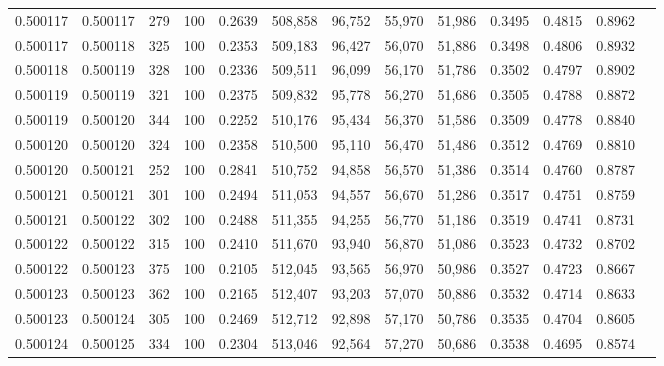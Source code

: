 \begin{tabular}{rrrrrrrrrrrrr}
0.500117 & 0.500117 &   279 & 100 &                                     0.2639 & 508,858 &  96,752 &  55,970 &  51,986 & 0.3495 & 0.4815 & 0.8962 \\
0.500117 & 0.500118 &   325 & 100 &                                     0.2353 & 509,183 &  96,427 &  56,070 &  51,886 & 0.3498 & 0.4806 & 0.8932 \\
0.500118 & 0.500119 &   328 & 100 &                                     0.2336 & 509,511 &  96,099 &  56,170 &  51,786 & 0.3502 & 0.4797 & 0.8902 \\
0.500119 & 0.500119 &   321 & 100 &                                     0.2375 & 509,832 &  95,778 &  56,270 &  51,686 & 0.3505 & 0.4788 & 0.8872 \\
0.500119 & 0.500120 &   344 & 100 &                                     0.2252 & 510,176 &  95,434 &  56,370 &  51,586 & 0.3509 & 0.4778 & 0.8840 \\
0.500120 & 0.500120 &   324 & 100 &                                     0.2358 & 510,500 &  95,110 &  56,470 &  51,486 & 0.3512 & 0.4769 & 0.8810 \\
0.500120 & 0.500121 &   252 & 100 &                                     0.2841 & 510,752 &  94,858 &  56,570 &  51,386 & 0.3514 & 0.4760 & 0.8787 \\
0.500121 & 0.500121 &   301 & 100 &                                     0.2494 & 511,053 &  94,557 &  56,670 &  51,286 & 0.3517 & 0.4751 & 0.8759 \\
0.500121 & 0.500122 &   302 & 100 &                                     0.2488 & 511,355 &  94,255 &  56,770 &  51,186 & 0.3519 & 0.4741 & 0.8731 \\
0.500122 & 0.500122 &   315 & 100 &                                     0.2410 & 511,670 &  93,940 &  56,870 &  51,086 & 0.3523 & 0.4732 & 0.8702 \\
0.500122 & 0.500123 &   375 & 100 &                                     0.2105 & 512,045 &  93,565 &  56,970 &  50,986 & 0.3527 & 0.4723 & 0.8667 \\
0.500123 & 0.500123 &   362 & 100 &                                     0.2165 & 512,407 &  93,203 &  57,070 &  50,886 & 0.3532 & 0.4714 & 0.8633 \\
0.500123 & 0.500124 &   305 & 100 &                                     0.2469 & 512,712 &  92,898 &  57,170 &  50,786 & 0.3535 & 0.4704 & 0.8605 \\
0.500124 & 0.500125 &   334 & 100 &                                     0.2304 & 513,046 &  92,564 &  57,270 &  50,686 & 0.3538 & 0.4695 & 0.8574 \\

\end{tabular}
